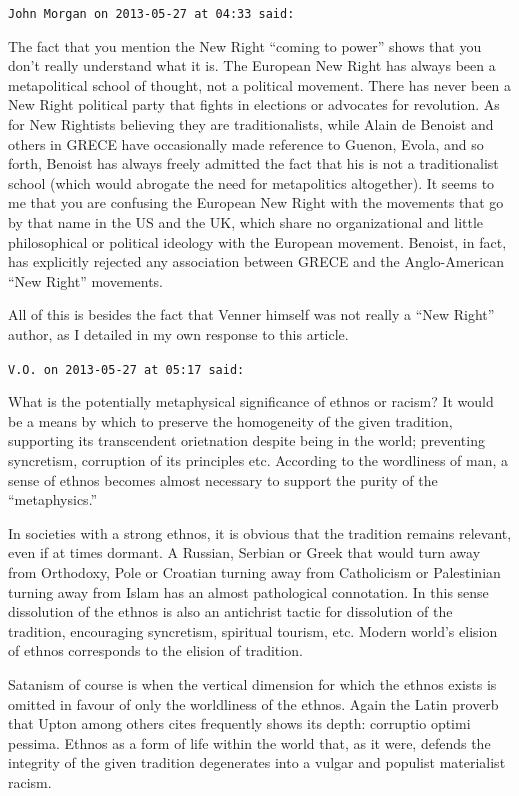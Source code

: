 \begin{footnotesize}
\begin{sffamily}
\hfill

\texttt{John Morgan on 2013-05-27 at 04:33 said:}

The fact that you mention the New Right ``coming to power'' shows that you don't really understand what it is. The European New Right has always been a metapolitical school of thought, not a political movement. There has never been a New Right political party that fights in elections or advocates for revolution. As for New Rightists believing they are traditionalists, while Alain de Benoist and others in GRECE have occasionally made reference to Guenon, Evola, and so forth, Benoist has always freely admitted the fact that his is not a traditionalist school (which would abrogate the need for metapolitics altogether). It seems to me that you are confusing the European New Right with the movements that go by that name in the US and the UK, which share no organizational and little philosophical or political ideology with the European movement. Benoist, in fact, has explicitly rejected any association between GRECE and the Anglo-American ``New Right'' movements.

All of this is besides the fact that Venner himself was not really a ``New Right'' author, as I detailed in my own response to this article.

\hfill

\texttt{V.O. on 2013-05-27 at 05:17 said:}

What is the potentially metaphysical significance of ethnos or racism? It would be a means by which to preserve the homogeneity of the given tradition, supporting its transcendent orietnation despite being in the world; preventing syncretism, corruption of its principles etc. According to the wordliness of man, a sense of ethnos becomes almost necessary to support the purity of the ``metaphysics.''

In societies with a strong ethnos, it is obvious that the tradition remains relevant, even if at times dormant. A Russian, Serbian or Greek that would turn away from Orthodoxy, Pole or Croatian turning away from Catholicism or Palestinian turning away from Islam has an almost pathological connotation. In this sense dissolution of the ethnos is also an antichrist tactic for dissolution of the tradition, encouraging syncretism, spiritual tourism, etc. Modern world's elision of ethnos corresponds to the elision of tradition.

Satanism of course is when the vertical dimension for which the ethnos exists is omitted in favour of only the worldliness of the ethnos. Again the Latin proverb that Upton among others cites frequently shows its depth: corruptio optimi pessima. Ethnos as a form of life within the world that, as it were, defends the integrity of the given tradition degenerates into a vulgar and populist materialist racism.


\end{sffamily}
\end{footnotesize}

